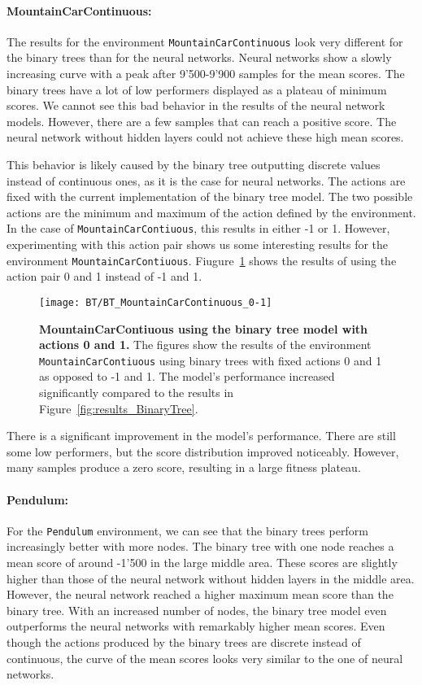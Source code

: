 \paragraph*{MountainCarContinuous:} The results for the environment \verb|MountainCarContinuous| look very different for the binary trees than for the neural networks. Neural networks show a slowly increasing curve with a peak after 9'500-9'900 samples for the mean scores. The binary trees have a lot of low performers displayed as a plateau of minimum scores. We cannot see this bad behavior in the results of the neural network models. However, there are a few samples that can reach a positive score. The neural network without hidden layers could not achieve these high mean scores.

This behavior is likely caused by the binary tree outputting discrete values instead of continuous ones, as it is the case for neural networks. The actions are fixed with the current implementation of the binary tree model. The two possible actions are the minimum and maximum of the action defined by the environment. In the case of \verb|MountainCarContiuous|, this results in either -1 or 1. However, experimenting with this action pair shows us some interesting results for the environment \verb|MountainCarContiuous|. Fiugure~\ref{fig:binary_tree_mountain_car_continuous} shows the results of using the action pair 0 and 1 instead of -1 and 1.
\begin{figure}[ht]
\centering
\texttt{[image: BT/BT\_MountainCarContinuous\_0-1]}
\caption[MountainCarContiuous using the binary tree model with actions 0 and 1]{
  \textbf{MountainCarContiuous using the binary tree model with actions 0 and 1.}
  The figures show the results of the environment \texttt{MountainCarContiuous} using binary trees with fixed actions 0 and 1 as opposed to -1 and 1. The model's performance increased significantly compared to the results in Figure~\ref{fig:results_BinaryTree}.
}
\label{fig:binary_tree_mountain_car_continuous}
\end{figure}
There is a significant improvement in the model's performance. There are still some low performers, but the score distribution improved noticeably. However, many samples produce a zero score, resulting in a large fitness plateau.

\paragraph*{Pendulum:} For the \verb|Pendulum| environment, we can see that the binary trees perform increasingly better with more nodes. The binary tree with one node reaches a mean score of around -1'500 in the large middle area. These scores are slightly higher than those of the neural network without hidden layers in the middle area. However, the neural network reached a higher maximum mean score than the binary tree. With an increased number of nodes, the binary tree model even outperforms the neural networks with remarkably higher mean scores. Even though the actions produced by the binary trees are discrete instead of continuous, the curve of the mean scores looks very similar to the one of neural networks.

